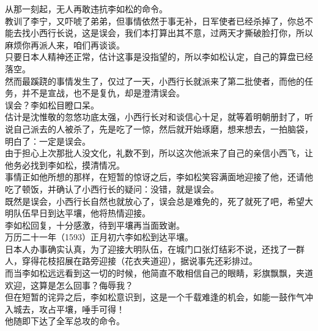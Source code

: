 \begin{multicols}{\theparacolNo}
从那一刻起，无人再敢违抗李如松的命令。\\

教训了李宁，又吓唬了弟弟，但事情依然于事无补，日军使者已经杀掉了，你总不能去找小西行长说，这是误会，我们本打算出其不意，过两天才撕破脸打你，所以麻烦你再派人来，咱们再谈谈。\\

只要日本人精神还正常，估计这事是没指望的，所以李如松认定，自己的算盘已经落空。\\

然而最蹊跷的事情发生了，仅过了一天，小西行长就派来了第二批使者，而他的任务，并不是宣战，也不是复仇，却是澄清误会。\\

误会？李如松目瞪口呆。\\

估计是沈惟敬的忽悠功底太强，小西行长对和谈信心十足，就等着明朝册封了，听说自己派去的人被杀了，先是吃了一惊，然后就开始琢磨，想来想去，一拍脑袋，明白了：一定是误会。\\

由于担心上次那批人没文化，礼数不到，所以这次他派来了自己的亲信小西飞，让他务必找到李如松，摸清情况。\\

事情正如他所想的那样，在短暂的惊讶之后，李如松笑容满面地迎接了他，还请他吃了顿饭，并确认了小西行长的疑问：没错，就是误会。\\

既然是误会，小西行长自然也就放心了，误会总是难免的，死了就死了吧，希望大明队伍早日到达平壤，他将热情迎接。\\

李如松回复，十分感激，待到平壤再当面致谢。\\

万历二十一年（1593）正月初六李如松到达平壤。\\

日本人办事确实认真，为了迎接大明队伍，在城门口张灯结彩不说，还找了一群人，穿得花枝招展在路旁迎接（花衣夹道迎），据说事先还彩排过。\\

而当李如松远远看到这一切的时候，他简直不敢相信自己的眼睛，彩旗飘飘，夹道欢迎，这算是怎么回事？侮辱我？\\

但在短暂的诧异之后，李如松意识到，这是一个千载难逢的机会，如能一鼓作气冲入城去，攻占平壤，唾手可得！\\

他随即下达了全军总攻的命令。\\


\end{multicols}
